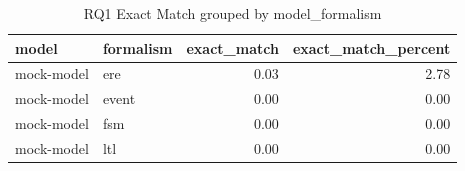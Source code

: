 \begin{table}
\caption{RQ1 Exact Match grouped by model_formalism}
\label{tab:rq1_model_formalism}
\begin{tabular}{llrr}
\toprule
model & formalism & exact_match & exact_match_percent \\
\midrule
mock-model & ere & 0.03 & 2.78 \\
mock-model & event & 0.00 & 0.00 \\
mock-model & fsm & 0.00 & 0.00 \\
mock-model & ltl & 0.00 & 0.00 \\
\bottomrule
\end{tabular}
\end{table}
